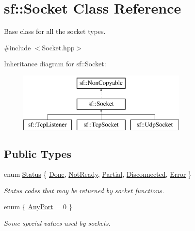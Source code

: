 \hypertarget{classsf_1_1_socket}{}\section{sf\+:\+:Socket Class Reference}
\label{classsf_1_1_socket}


Base class for all the socket types.  




{\ttfamily \#include $<$Socket.\+hpp$>$}

Inheritance diagram for sf\+:\+:Socket\+:\begin{figure}[H]
\begin{center}
\leavevmode
\includegraphics[height=3.000000cm]{classsf_1_1_socket}
\end{center}
\end{figure}
\subsection*{Public Types}
\begin{DoxyCompactItemize}
\item 
enum \mbox{\hyperlink{classsf_1_1_socket_a51bf0fd51057b98a10fbb866246176dc}{Status}} \{ \newline
\mbox{\hyperlink{classsf_1_1_socket_a51bf0fd51057b98a10fbb866246176dca1de3a85bc56d3ae85b3d0f3cfd04ae90}{Done}}, 
\mbox{\hyperlink{classsf_1_1_socket_a51bf0fd51057b98a10fbb866246176dca8554848daae98f996e131bdeed076c09}{Not\+Ready}}, 
\mbox{\hyperlink{classsf_1_1_socket_a51bf0fd51057b98a10fbb866246176dca181c163fad2eaea927185d127c392706}{Partial}}, 
\mbox{\hyperlink{classsf_1_1_socket_a51bf0fd51057b98a10fbb866246176dcab215141f756acdc23c67fad149710eb1}{Disconnected}}, 
\newline
\mbox{\hyperlink{classsf_1_1_socket_a51bf0fd51057b98a10fbb866246176dca1dc9854433a28c22e192721179a2df5d}{Error}}
 \}
\begin{DoxyCompactList}\small\item\em Status codes that may be returned by socket functions. \end{DoxyCompactList}\item 
enum \{ \mbox{\hyperlink{classsf_1_1_socket_aa3e6c984bcb81a35234dcc9cc8369d75a5a3c30fd128895403afc11076f461b19}{Any\+Port}} = 0
 \}
\begin{DoxyCompactList}\small\item\em Some special values used by sockets. \end{DoxyCompactList}\end{DoxyCompactItemize}
